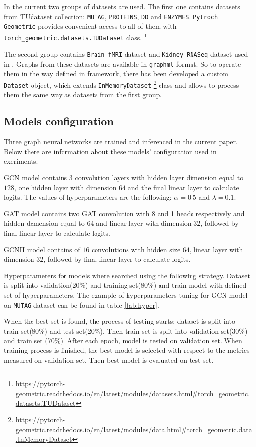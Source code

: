 In the current two groups of datasets are used. The first one contains datasets from TUdataset\cite{TUDataset}
collection: \texttt{MUTAG}, \texttt{PROTEINS}, \texttt{DD} and \texttt{ENZYMES}. \texttt{Pytroch Geometric}
 provides convenient access to all of them with \texttt{torch\_geometric.datasets.TUDataset} class.
\footnote{\url{https://pytorch-geometric.readthedocs.io/en/latest/modules/datasets.html\#torch_geometric.datasets.TUDataset}}

The second group contains \texttt{Brain fMRI} dataset and \texttt{Kidney RNASeq} dataset used in \cite{Netpro2vec}. Graphs from
these datasets are available in \texttt{graphml} format. So to operate them in the way
defined in framework, there has been developed a custom \texttt{Dataset} object, which
extends \texttt{InMemoryDataset} \footnote{\url{https://pytorch-geometric.readthedocs.io/en/latest/modules/data.html\#torch_geometric.data.InMemoryDataset}}
class and allows to process them the same way as datasets from the first group.

\subsection{Models configuration}

Three graph neural networks are trained and inferenced in the current paper. Below there are information
about these models' configuration used in exeriments.

GCN model contains 3 convolution layers with hidden layer dimension equal to $128$,
one hidden layer with dimension $64$ and the final linear layer to calculate logits.
The values of hyperparameters are the following: $\alpha=0.5$ and $\lambda=0.1$.

GAT model contains two GAT convolution with 8 and 1 heads respectively and hidden demension equal to $64$
and linear layer with dimension $32$, followed by  final linear layer to calculate logits.

GCNII model contains of $16$ convolutions with hidden size $64$,  linear layer with dimension $32$,
followed by  final linear layer to calculate logits.

Hyperparameters for models where searched using the following strategy.
Dataset is split into validation(20\%) and training set(80\%) and train model
with defined set of hyperparameters. The example of hyperparameters tuning 
for GCN model on \texttt{MUTAG} dataset can be found in table \ref{tab:hyper}.

When the best set is found, 
the process of testing starts: dataset is split into train set(80\%) and 
test set(20\%). Then train set is split into validation set(30\%) and train set (70\%).
After each epoch, model is tested on validation set. When training process is finished,
the best model is selected with respect to the metrics measured on validation set.
Then best model is evaluated on test set.


